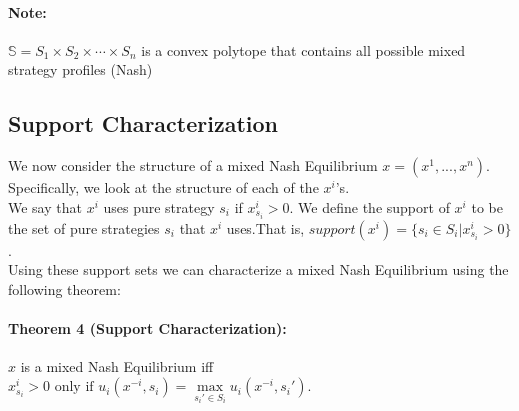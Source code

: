 \documentclass[12pt]{article}
\newcommand{\Note}{\paragraph{Note:}}
\begin{document}
\Note $\mathbb{S} = S_1 \times S_2 \times \cdots \times S_n$ is a convex polytope that contains all possible mixed strategy profiles (Nash)

\subsection{Support Characterization}

We now consider the structure of a mixed Nash Equilibrium $x = (x^1,..., x^n)$. Specifically, we look at the structure of each of the $x^i$’s.\\

We say that $x^i$ uses pure strategy $s_i$ if $x^i_{s_i} > 0$. We define the support of $x^i$ to be the set of pure strategies $s_i$ that $x^i$ uses.That is, $support(x^i) = \{s_i \in S_i | x^i_{s_i} > 0\}$.\\
 
Using these support sets we can characterize a mixed Nash Equilibrium using the following theorem:

\paragraph{Theorem 4 (Support Characterization):}$x$ is a mixed Nash Equilibrium iff $x^i_{s_i} > 0 \text{ only if } u_i(x^{-i}, s_i) = \max\limits_{ s_i' \in S_i} u_i(x^{-i}, s_i').$
\end{document}
